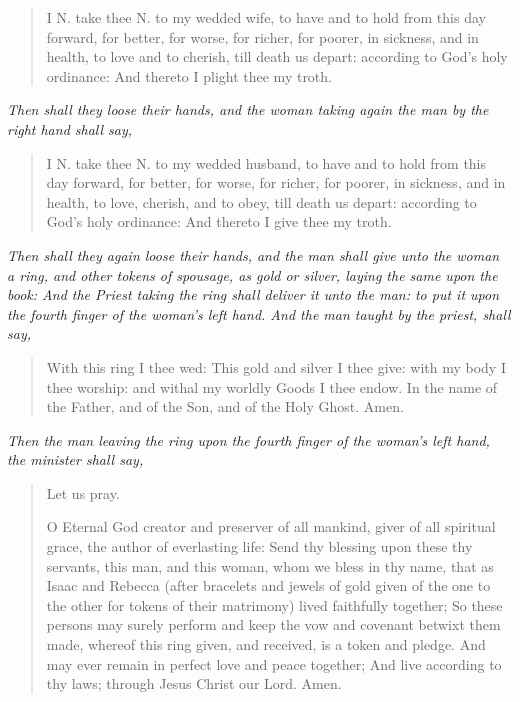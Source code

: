 \documentclass[
]{book}
\begin{document}
\begin{quote}
I N. take thee N. to my wedded wife, to have and to hold from this day forward, for better, for worse, for richer, for poorer, in sickness, and in health, to love and to cherish, till death us depart: according to God's holy ordinance: And thereto I plight thee my troth.
\end{quote}

\begin{center}
\emph{Then shall they loose their hands, and the woman taking again the man by the right hand shall say,}

\end{center}

\begin{quote}
I N. take thee N. to my wedded husband, to have and to hold from this day forward, for better, for worse, for richer, for poorer, in sickness, and in health, to love, cherish, and to obey, till death us depart: according to God's holy ordinance: And thereto I give thee my troth.
\end{quote}

\begin{center}
\emph{Then shall they again loose their hands, and the man shall give unto the woman a ring, and other tokens of spousage, as gold or silver, laying the same upon the book: And the Priest taking the ring shall deliver it unto the man: to put it upon the fourth finger of the woman's left hand. And the man taught by the priest, shall say,}

\end{center}

\begin{quote}
With this ring I thee wed: This gold and silver I thee give: with my body I thee worship: and withal my worldly Goods I thee endow. In the name of the Father, and of the Son, and of the Holy Ghost. Amen.
\end{quote}

\begin{center}
\emph{Then the man leaving the ring upon the fourth finger of the woman's left hand, the minister shall say,}

\end{center}

\begin{quote}
Let us pray.

O Eternal God creator and preserver of all mankind, giver of all spiritual grace, the author of everlasting life: Send thy blessing upon these thy servants, this man, and this woman, whom we bless in thy name, that as Isaac and Rebecca (after bracelets and jewels of gold given of the one to the other for tokens of their matrimony) lived faithfully together; So these persons may surely perform and keep the vow and covenant betwixt them made, whereof this ring given, and received, is a token and pledge. And may ever remain in perfect love and peace together; And live according to thy laws; through Jesus Christ our Lord. Amen.
\end{quote}
\end{document}
